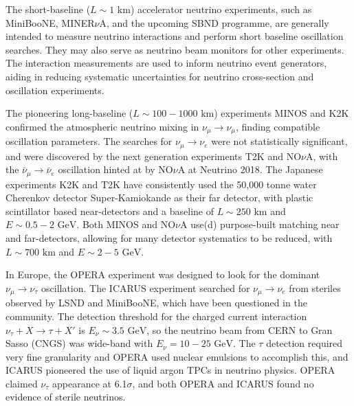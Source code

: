 The short-baseline ($L\sim 1\text{ km}$) accelerator neutrino experiments, such as MiniBooNE\cite{mb_design}, MINER$\nu$A\cite{minerva_design}, and the upcoming SBND programme\cite{sbnd}, are generally intended to measure neutrino interactions and perform short baseline oscillation searches. They may also serve as neutrino beam monitors for other experiments. The interaction measurements are used to inform neutrino event generators\cite{neut,genie,NuWro}, aiding in reducing systematic uncertainties for neutrino cross-section and oscillation experiments.

The pioneering long-baseline ($L\sim 100-1000\text{ km}$) experiments MINOS\cite{minos_obs} and K2K\cite{k2k_obs} confirmed the atmospheric neutrino mixing in $\nu_\mu \rightarrow \nu_\mu$, finding compatible oscillation parameters. The searches for $\nu_\mu \rightarrow \nu_e$ were not statistically significant\cite{k2k_noobs,minos_disc}, and were discovered by the next generation experiments T2K\cite{t2k_disc} and NO$\nu$A\cite{nova_disc}, with the $\bar{\nu}_\mu \rightarrow \bar{\nu}_e$ oscillation hinted at by NO$\nu$A at Neutrino 2018\cite{nova_neutrino2018}. The Japanese experiments K2K and T2K have consistently used the 50,000 tonne water Cherenkov detector Super-Kamiokande\cite{superk} as their far detector, with plastic scintillator based near-detectors and a baseline of $L\sim250\text{ km}$ and $E\sim0.5-2\text{ GeV}$. Both MINOS and NO$\nu$A use(d) purpose-built matching near and far-detectors, allowing for many detector systematics to be reduced, with $L\sim700\text{ km}$ and $E\sim2-5\text{ GeV}$.

In Europe, the OPERA\cite{opera} experiment was designed to look for the dominant $\nu_\mu \rightarrow \nu_\tau$ oscillation. The ICARUS\cite{icarus} experiment searched for $\nu_\mu\rightarrow\nu_e$ from steriles observed by LSND\cite{lsnd} and MiniBooNE\cite{miniboone_sterile}, which have been questioned in the community\cite{lsnd_refute}. The detection threshold for the charged current interaction $\nu_\tau + X \rightarrow \tau + X'$ is $E_\nu\sim 3.5\text{ GeV}$, so the neutrino beam from CERN to Gran Sasso (CNGS)\cite{cngs} was wide-band with $E_\nu = 10-25\text{ GeV}$. The $\tau$ detection required very fine granularity and OPERA used nuclear emulsions to accomplish this, and ICARUS pioneered the use of liquid argon TPCs in neutrino physics. OPERA claimed $\nu_\tau$ appearance\cite{opera_final_tau} at 6.1$\sigma$, and both OPERA and ICARUS found no evidence of sterile neutrinos\cite{icarus_lsnd,opera_lsnd}.

